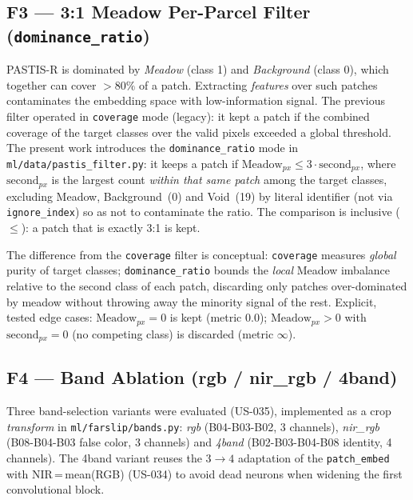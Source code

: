 \subsection{F3 --- 3:1 Meadow Per-Parcel Filter (\texttt{dominance\_ratio})}
\label{sec:farslip_f3}

PASTIS-R is dominated by \textit{Meadow} (class 1) and \textit{Background}
(class 0), which together can cover $>80\%$ of a patch. Extracting
\textit{features} over such patches contaminates the embedding space with
low-information signal. The previous filter operated in \texttt{coverage} mode
(legacy): it kept a patch if the combined coverage of the target classes over the
valid pixels exceeded a global threshold. The present work introduces the
\texttt{dominance\_ratio} mode in \texttt{ml/data/pastis\_filter.py}: it keeps a
patch if $\text{Meadow}_{px} \leq 3 \cdot \text{second}_{px}$, where
$\text{second}_{px}$ is the largest count \textit{within that same patch} among
the target classes, excluding Meadow, Background~(0) and Void~(19) by literal
identifier (not via \texttt{ignore\_index}) so as not to contaminate the ratio.
The comparison is inclusive ($\leq$): a patch that is exactly 3:1 is kept.

The difference from the \texttt{coverage} filter is conceptual: \texttt{coverage}
measures \textit{global} purity of target classes; \texttt{dominance\_ratio}
bounds the \textit{local} Meadow imbalance relative to the second class of each
patch, discarding only patches over-dominated by meadow without throwing away the
minority signal of the rest. Explicit, tested edge cases:
$\text{Meadow}_{px}=0$ is kept (metric $0.0$); $\text{Meadow}_{px}>0$ with
$\text{second}_{px}=0$ (no competing class) is discarded (metric $\infty$).

\subsection{F4 --- Band Ablation (rgb / nir\_rgb / 4band)}
\label{sec:farslip_f4}

Three band-selection variants were evaluated (US-035), implemented as a crop
\textit{transform} in \texttt{ml/farslip/bands.py}: \textit{rgb}
(B04-B03-B02, 3 channels), \textit{nir\_rgb} (B08-B04-B03 false color, 3
channels) and \textit{4band} (B02-B03-B04-B08 identity, 4 channels). The 4band
variant reuses the $3\rightarrow4$ adaptation of the \texttt{patch\_embed} with
NIR\,=\,mean(RGB) (US-034) to avoid dead neurons when widening the first
convolutional block.

